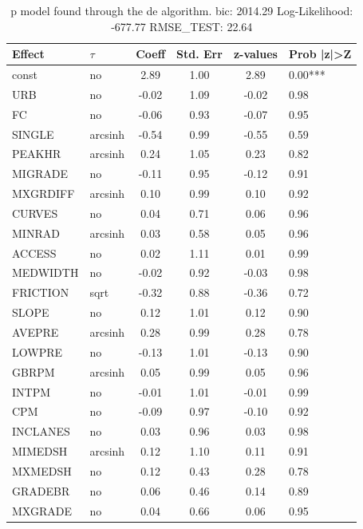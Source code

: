 \begin{table}
	\caption{p model found through the de algorithm. bic: 2014.29 Log-Likelihood: -677.77 RMSE_TEST: 22.64}
	\begin{center}
		\begin{tabular}{|l|l|c|c|c|l|}
			\hline
			Effect & $\tau$ & Coeff & Std. Err & z-values & Prob |z|>Z \\
			\hline
			const & no & 2.89 & 1.00 & 2.89 & 0.00*** \\
			\hline
			URB & no & -0.02 & 1.09 & -0.02 & 0.98 \\
			\hline
			FC & no & -0.06 & 0.93 & -0.07 & 0.95 \\
			\hline
			SINGLE & arcsinh & -0.54 & 0.99 & -0.55 & 0.59 \\
			\hline
			PEAKHR & arcsinh & 0.24 & 1.05 & 0.23 & 0.82 \\
			\hline
			MIGRADE & no & -0.11 & 0.95 & -0.12 & 0.91 \\
			\hline
			MXGRDIFF & arcsinh & 0.10 & 0.99 & 0.10 & 0.92 \\
			\hline
			CURVES & no & 0.04 & 0.71 & 0.06 & 0.96 \\
			\hline
			MINRAD & arcsinh & 0.03 & 0.58 & 0.05 & 0.96 \\
			\hline
			ACCESS & no & 0.02 & 1.11 & 0.01 & 0.99 \\
			\hline
			MEDWIDTH & no & -0.02 & 0.92 & -0.03 & 0.98 \\
			\hline
			FRICTION & sqrt & -0.32 & 0.88 & -0.36 & 0.72 \\
			\hline
			SLOPE & no & 0.12 & 1.01 & 0.12 & 0.90 \\
			\hline
			AVEPRE & arcsinh & 0.28 & 0.99 & 0.28 & 0.78 \\
			\hline
			LOWPRE & no & -0.13 & 1.01 & -0.13 & 0.90 \\
			\hline
			GBRPM & arcsinh & 0.05 & 0.99 & 0.05 & 0.96 \\
			\hline
			INTPM & no & -0.01 & 1.01 & -0.01 & 0.99 \\
			\hline
			CPM & no & -0.09 & 0.97 & -0.10 & 0.92 \\
			\hline
			INCLANES & no & 0.03 & 0.96 & 0.03 & 0.98 \\
			\hline
			MIMEDSH & arcsinh & 0.12 & 1.10 & 0.11 & 0.91 \\
			\hline
			MXMEDSH & no & 0.12 & 0.43 & 0.28 & 0.78 \\
			\hline
			GRADEBR & no & 0.06 & 0.46 & 0.14 & 0.89 \\
			\hline
			MXGRADE & no & 0.04 & 0.66 & 0.06 & 0.95 \\

\end{tabular}
\end{center}
\end{table}
